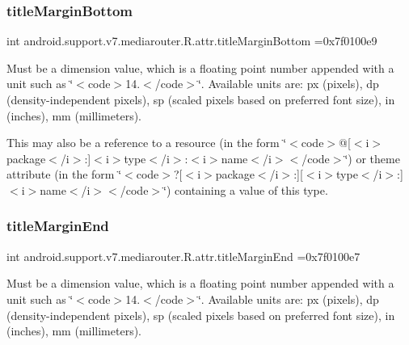 \subsubsection{\texorpdfstring{title\+Margin\+Bottom}{titleMarginBottom}}
{\footnotesize\ttfamily int android.\+support.\+v7.\+mediarouter.\+R.\+attr.\+title\+Margin\+Bottom =0x7f0100e9\hspace{0.3cm}{\ttfamily [static]}}

Must be a dimension value, which is a floating point number appended with a unit such as \char`\"{}$<$code$>$14.\+5sp$<$/code$>$\char`\"{}. Available units are\+: px (pixels), dp (density-\/independent pixels), sp (scaled pixels based on preferred font size), in (inches), mm (millimeters). 

This may also be a reference to a resource (in the form \char`\"{}$<$code$>$@\mbox{[}$<$i$>$package$<$/i$>$\+:\mbox{]}$<$i$>$type$<$/i$>$\+:$<$i$>$name$<$/i$>$$<$/code$>$\char`\"{}) or theme attribute (in the form \char`\"{}$<$code$>$?\mbox{[}$<$i$>$package$<$/i$>$\+:\mbox{]}\mbox{[}$<$i$>$type$<$/i$>$\+:\mbox{]}$<$i$>$name$<$/i$>$$<$/code$>$\char`\"{}) containing a value of this type. \mbox{\label{classandroid_1_1support_1_1v7_1_1mediarouter_1_1R_1_1attr_a52541b0c2f637e47a0aec99ecf3a1016}} 
\subsubsection{\texorpdfstring{title\+Margin\+End}{titleMarginEnd}}
{\footnotesize\ttfamily int android.\+support.\+v7.\+mediarouter.\+R.\+attr.\+title\+Margin\+End =0x7f0100e7\hspace{0.3cm}{\ttfamily [static]}}

Must be a dimension value, which is a floating point number appended with a unit such as \char`\"{}$<$code$>$14.\+5sp$<$/code$>$\char`\"{}. Available units are\+: px (pixels), dp (density-\/independent pixels), sp (scaled pixels based on preferred font size), in (inches), mm (millimeters). 

